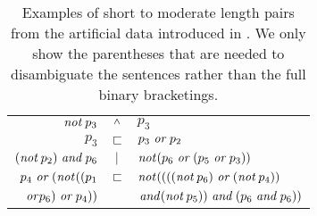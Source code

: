 \begin{table}[tp]
  \centering\small
    \begin{tabular}[t]{r c l}
      \toprule
      $\plneg p_3$        & $\natneg$ & $p_3$ \\
      $p_3$               & $\natfor$ & $p_3 \plor p_2$ \\
      $(\plneg p_2) \pland p_6  $ & $\natalt$ & $     \plneg ( p_6 \plor ( p_5 \plor p_3 ) ) $\\
 $    p_4 \plor ( \plneg ( ( p_1   $ & $ \natfor $ & $  \plneg ( ( ( ( \plneg p_6 ) \plor ( \plneg p_4 ) )   $\\      
$ \plor p_6 )  \plor p_4 ) )$ &&$ \pland ( \plneg p_5 ) )\pland ( p_6 \pland p_6 ) ) $\\
      \bottomrule
    \end{tabular}
    \caption{Examples of short to moderate length pairs from the artificial data introduced in \protect\cite{Bowman:Potts:Manning:2014}. We only show the parentheses that are needed to disambiguate the sentences rather than the full binary bracketings.}\label{tab:plexs}
\end{table}


